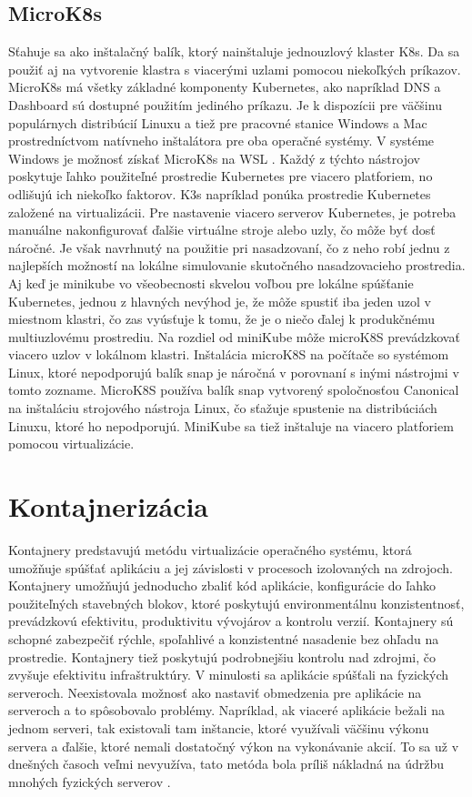 \subsection*{MicroK8s}
Sťahuje sa ako inštalačný balík, ktorý nainštaluje jednouzlový klaster K8s. Da sa použiť aj na vytvorenie klastra s viacerými uzlami pomocou niekoľkých príkazov. MicroK8s má všetky základné komponenty Kubernetes, ako napríklad DNS a Dashboard sú dostupné použitím jediného príkazu. Je k dispozícii pre väčšinu populárnych distribúcií Linuxu a tiež pre pracovné stanice Windows a Mac prostredníctvom natívneho inštalátora pre oba operačné systémy. V systéme Windows je možnosť získať MicroK8s na WSL \cite{comparetool}.
\newline
\newline
Každý z týchto nástrojov poskytuje ľahko použiteľné prostredie Kubernetes pre viacero platforiem, no odlišujú ich niekoľko faktorov. K3s napríklad ponúka prostredie Kubernetes založené na virtualizácii. Pre nastavenie viacero serverov Kubernetes, je potreba manuálne nakonfigurovať ďalšie virtuálne stroje alebo uzly, čo môže byť dosť náročné. Je však navrhnutý na použitie pri nasadzovaní, čo z neho robí jednu z najlepších možností na lokálne simulovanie skutočného nasadzovacieho prostredia. Aj keď je minikube vo všeobecnosti skvelou voľbou pre lokálne spúšťanie Kubernetes, jednou z hlavných nevýhod je, že môže spustiť iba jeden uzol v miestnom klastri, čo zas vyúsťuje k tomu, že je o niečo ďalej k produkčnému multiuzlovému prostrediu. Na rozdiel od miniKube môže microK8S prevádzkovať viacero uzlov v lokálnom klastri. Inštalácia microK8S na počítače so systémom Linux, ktoré nepodporujú balík snap je náročná v porovnaní s inými nástrojmi v tomto zozname. MicroK8S používa balík snap vytvorený spoločnosťou Canonical na inštaláciu strojového nástroja Linux, čo sťažuje spustenie na distribúciách Linuxu, ktoré ho nepodporujú. MiniKube sa tiež inštaluje na viacero platforiem pomocou virtualizácie.

\section{Kontajnerizácia}

Kontajnery predstavujú metódu virtualizácie operačného systému, ktorá umožňuje spúšťať aplikáciu a jej závislosti v procesoch izolovaných na zdrojoch. Kontajnery umožňujú jednoducho zbaliť kód aplikácie, konfigurácie do ľahko použiteľných stavebných blokov, ktoré poskytujú environmentálnu konzistentnosť, prevádzkovú efektivitu, produktivitu vývojárov a kontrolu verzií. Kontajnery sú schopné zabezpečiť rýchle, spoľahlivé a konzistentné nasadenie bez ohľadu na prostredie. Kontajnery tiež poskytujú podrobnejšiu kontrolu nad zdrojmi, čo zvyšuje efektivitu infraštruktúry. V minulosti sa aplikácie spúšťali na fyzických serveroch. Neexistovala možnosť ako nastaviť obmedzenia pre aplikácie na serveroch a to spôsobovalo problémy. Napríklad, ak viaceré aplikácie bežali na jednom serveri, tak existovali tam inštancie, ktoré využívali väčšinu výkonu servera a ďalšie, ktoré nemali dostatočný výkon na vykonávanie akcií. To sa už v dnešných časoch veľmi nevyužíva, tato metóda bola príliš nákladná na údržbu mnohých fyzických serverov \cite{container}.

